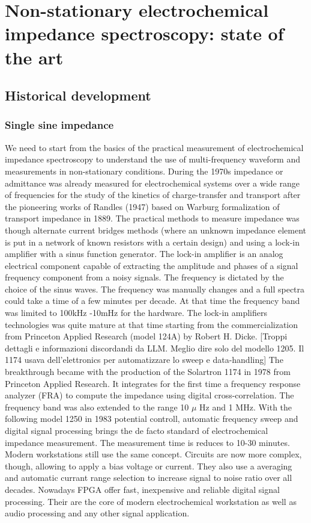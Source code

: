 \chapter[Non-stationary electrochemical impedance spectroscopy]{Non-stationary electrochemical impedance spectroscopy: state of the art}

\section{Historical development}

\subsection{Single sine impedance}
We need to start from the basics of the practical measurement of electrochemical impedance spectroscopy to understand the use of multi-frequency waveform and measurements in non-stationary conditions. During the 1970s impedance or admittance was already measured for electrochemical systems over a wide range of frequencies for the study of the kinetics of charge-transfer and transport after the pioneering works of Randles (1947) based on Warburg formalization of transport impedance in 1889. The practical methods to measure impedance was though alternate current bridges methods (where an unknown impedance element is put in a network of known resistors with a certain design) and using a lock-in amplifier with a sinus function generator. The lock-in amplifier is an analog electrical component capable of extracting the amplitude and phases of a signal frequency component from a noisy signals. The frequency is dictated by the choice of the sinus waves. The frequency was manually changes and a full spectra could take a time of a few minutes per decade. At that time the frequency band was limited to 100kHz -10mHz for the hardware. The lock-in amplifiers technologies was quite mature at that time starting from the commercialization from Princeton Applied  Research (model 124A) by Robert H. Dicke. 
[Troppi dettagli e informazioni discordandi da LLM. Meglio dire solo del modello 1205. Il 1174 usava dell'elettronics per automatizzare lo sweep e data-handling] The breakthrough became with the production of the Solartron 1174 in 1978 from Princeton Applied  Research. It integrates for the first time a frequency response analyzer (FRA) to compute the impedance using digital cross-correlation. The frequency band was also extended to the range 10 $\mu$ Hz and 1 MHz. With the following model 1250 in 1983 potential controll, automatic frequency sweep and digital signal processing brings the de facto standard of electrochemical impedance measurement. The measurement time is reduces to 10-30 minutes. 
Modern workstations still use the same concept. Circuits are now more complex, though, allowing to apply a bias voltage or current. They also use a averaging and automatic currant range selection to increase signal to noise ratio over all decades.
Nowadays FPGA offer fast, inexpensive and reliable digital signal processing. Their are the core of modern electrochemical workstation as well as audio processing and any other signal application.

